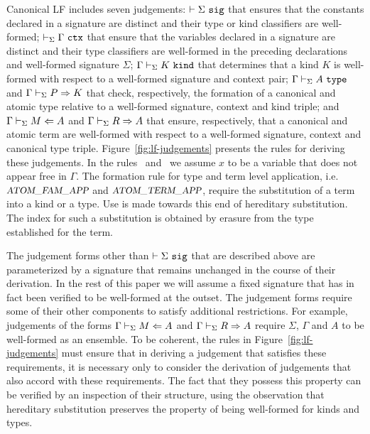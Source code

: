 Canonical LF includes seven judgements: $\vdash {\Sigma}\ \mbox{\tt sig}$ that ensures
that the constants declared in a signature are distinct and their type
or kind classifiers are well-formed; $\vdash_{\Sigma} \Gamma\ \mbox{\tt ctx}$ that ensure that
the variables declared in a signature are distinct and their type
classifiers are well-formed in the preceding declarations and
well-formed signature $\Sigma$; $\Gamma \vdash_{\Sigma} K\ \mbox{\tt kind}$ that determines
that a kind $K$ is well-formed with respect to a well-formed signature
and context pair; $\Gamma \vdash_{\Sigma} A\ \mbox{\tt type}$ and
$\Gamma \vdash_{\Sigma} P\Rightarrow K$ that check, respectively, the formation
of a canonical and atomic type relative to a well-formed 
signature, context and kind triple; and $\Gamma \vdash_{\Sigma} M\Leftarrow A$ and
$\Gamma \vdash_{\Sigma} R\Rightarrow A$ that ensure, respectively, that a
canonical and atomic term are well-formed with respect to a
well-formed signature, context and canonical type triple. 
%
Figure~\ref{fig:lf-judgements} presents the rules for deriving
these judgements.
%
In the rules \canonkindpi\ and \canontermlam\ we assume $x$ to be a
variable that does not appear free in $\Gamma$.
%
The formation rule for type and term level application,
i.e. $\mbox{\sl\small ATOM\_FAM\_APP}$ and $\mbox{\sl\small ATOM\_TERM\_APP}$, require the substitution of a
term into a kind or a type.
%
Use is made towards this end of hereditary substitution. The index for
such a substitution is obtained by erasure from the type established
for the term.

The judgement forms other than $\vdash {\Sigma}\ \mbox{\tt sig}$ that are described
above are parameterized by a signature that remains unchanged in the
course of their derivation.
%
In the rest of this paper we will assume a fixed signature that has in
fact been verified to be well-formed at the outset. 
%
The judgement forms require some of their other components to satisfy
additional restrictions. 
%
For example, judgements of the forms $\Gamma \vdash_{\Sigma} M\Leftarrow A$ and
$\Gamma \vdash_{\Sigma} R\Rightarrow A$ require $\Sigma$, $\Gamma$ and $A$
to be well-formed as an ensemble.
%
To be coherent, the rules in Figure~\ref{fig:lf-judgements} must
ensure that in deriving a judgement that satisfies these requirements,
it is necessary only to consider the derivation of judgements that
also accord with these requirements.
%
The fact that they possess this property can be verified by an
inspection of their structure, using the observation that
hereditary substitution preserves the property of being well-formed
for kinds and types.  


